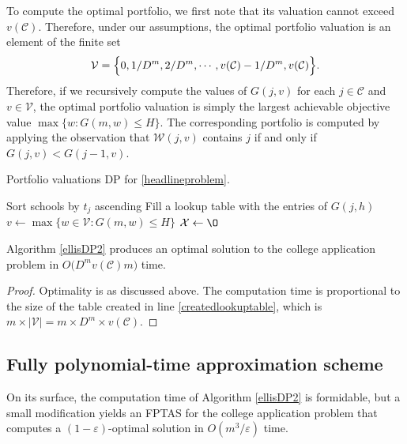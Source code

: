 To compute the optimal portfolio, we first note that its valuation cannot exceed $v(\mathcal{C})$. Therefore, under our assumptions, the optimal portfolio valuation is an element of the finite set
\begin{equation}
\mathcal{V} = \Bigl\{0, 1/D^m, 2/D^m, \cdots, v(\mathcal{C}) - 1/ D^m, v(\mathcal{C})\Bigr\}.
\end{equation}
Therefore, if we recursively compute the values of $G(j, v)$ for each $j\in \mathcal{C}$ and $v \in \mathcal{V}$, the optimal portfolio valuation is simply the largest achievable objective value $\max\{ w: G(m, w) \leq H\}$. The corresponding portfolio is computed by applying the observation that $\mathcal{W}(j, v)$ contains $j$ if and only if $G(j, v) < G(j-1, v)$.

\begin{algorithm}[h] 
\caption{Portfolio valuations DP for \eqref{headlineproblem}.} \label{ellisDP2}
Sort schools by $t_j$ ascending\;
Fill a lookup table with the entries of $G(j, h)$\; \label{createdlookuptable}
$v\gets  \max\{ w \in \mathcal{V} : G(m, w) \leq H\}$\; \label{vrecordedhere}
$\mathcal{X} \gets \O$\;
\;
\end{algorithm}

\begin{theorem}
Algorithm \ref{ellisDP2} produces an optimal solution to the college application problem in $O\bigl( D^m v(\mathcal{C}) m \bigr)$ time.
\end{theorem}

\begin{proof}
Optimality is as discussed above. The computation time is proportional to the size of the table created in line \ref{createdlookuptable}, which is $m \times |\mathcal{V}| = m \times D^m \times v(\mathcal{C}) $. 
\end{proof}

\subsection{Fully polynomial-time approximation scheme}
On its surface, the computation time of Algorithm \ref{ellisDP2} is formidable, but a small modification yields an FPTAS for the college application problem that computes a $(1 - \varepsilon)$-optimal solution in $O(m^3 / \varepsilon)$ time.

